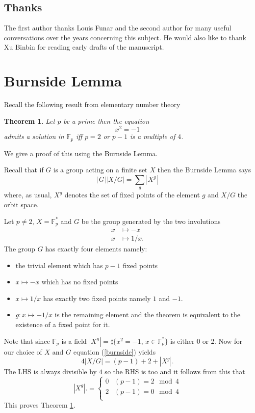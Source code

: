\documentclass[12pt,a4paper]{amsart}
\newtheorem{thm}{Theorem}[section]
\def\fp{\mathbb{F}_p}
\begin{document}
\subsection{Thanks}

The first author thanks Louis Funar and the second author for  many useful conversations over the years concerning this subject. He would also like to thank Xu Binbin for reading early drafts of the manuscript.


\section{Burnside Lemma}

Recall the following result from elementary number theory
\begin{thm}\label{triv}
Let $p$ be a prime then the equation
$$x^2 = -1$$
admits a solution in $\fp$ iff 
$p =2$ or $p-1$ is a multiple of $4$.
\end{thm}

We give a proof of this using the Burnside Lemma.


Recall that if $G$ is  a group acting on a finite set $X$ then the Burnside Lemma says
\begin{equation}\label{burnside}
|G| |X/G| = \sum_{g} |X^g| 
\end{equation}  
where, as usual, 
 $X^g$ denotes the set of fixed points of the element $g$ 
 and $X/G$  the orbit space.


Let $p\neq 2$,  $X = \fp^*$ and $G$ be the group generated by the two involutions
\begin{eqnarray*}
x & \mapsto -x \\
x & \mapsto 1/x.
\end{eqnarray*}
The group  $G$ has exactly four elements namely:
\begin{itemize}
\item the trivial element which has  $p-1$ fixed points
\item $x\mapsto -x$ which has no fixed points 
\item  $x\mapsto 1/x$ has exactly two fixed points namely $1$ and $-1$.
\item  $g:x \mapsto -1/x$ is the remaining element and the theorem is equivalent to the existence of a fixed point for it.
\end{itemize}
Note that since $\fp$ is a field 
$|X^g| = \sharp \{x^2 = -1, \, x\in \fp^* \}$
is either $0$ or $2$.
Now for our choice of $X$ and $G$ equation (\ref{burnside}) yields
\begin{equation}
4 |X/G|   = (p-1) + 2 + |X^g|.
\end{equation}  
The LHS is always divisible by $4$ so the  RHS is too and
it follows from this that
$$ |X^g|. = \left\{  \begin{array}{ll}
0 & (p-1) =  2 \mod 4 \\
2 & (p-1) =  0 \mod 4 \\
\end{array}
\right.
$$
This proves Theorem \ref{triv}.
\end{document}
